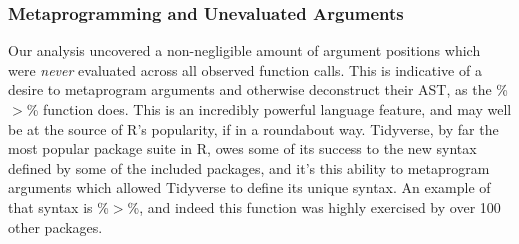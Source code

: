 \documentclass[acmsmall,10pt,review,anonymous]{acmart}\settopmatter{printfolios=true,printccs=false,printacmref=false}
\begin{document}

%
%
%
%
\subsubsection{Metaprogramming and Unevaluated Arguments}

Our analysis uncovered a non-negligible amount of argument positions which were {\it never} evaluated across all observed function calls.
This is indicative of a desire to metaprogram arguments and otherwise deconstruct their AST, as the \%$>$\% function does.
This is an incredibly powerful language feature, and may well be at the source of R's popularity, if in a roundabout way.
Tidyverse, by far the most popular package suite in R, owes some of its success to the new syntax defined by some of the included packages, and it's this ability to metaprogram arguments which allowed Tidyverse to define its unique syntax.
An example of that syntax is \%$>$\%, and indeed this function was highly exercised by over 100 other packages.
\end{document}
